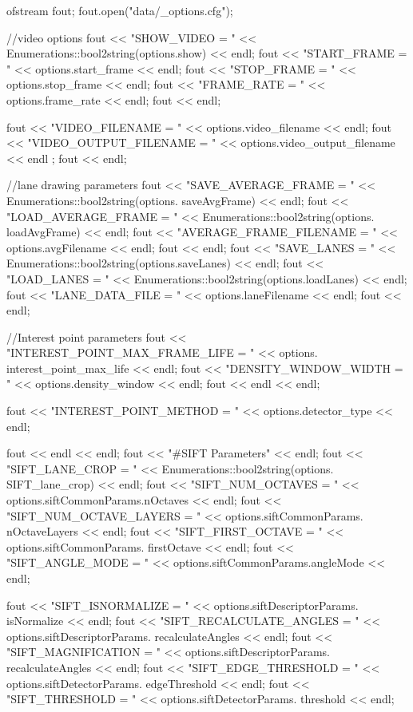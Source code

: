 \begin{DoxyCode}
                                                 {

    ofstream fout;
    fout.open("data/_options.cfg");

    //video options
    fout << "SHOW_VIDEO     = " << Enumerations::bool2string(options.show) << 
      endl;
    fout << "START_FRAME    = " << options.start_frame << endl;
    fout << "STOP_FRAME     = " << options.stop_frame << endl;
    fout << "FRAME_RATE     = " << options.frame_rate << endl;
    fout << endl;


    fout << "VIDEO_FILENAME = " << options.video_filename << endl;
    fout << "VIDEO_OUTPUT_FILENAME = " << options.video_output_filename << endl
      ;
    fout << endl;

    //lane drawing parameters
    fout << "SAVE_AVERAGE_FRAME     = " << Enumerations::bool2string(options.
      saveAvgFrame) << endl;
    fout << "LOAD_AVERAGE_FRAME     = " << Enumerations::bool2string(options.
      loadAvgFrame) << endl;
    fout << "AVERAGE_FRAME_FILENAME = " << options.avgFilename << endl;
    fout << endl;
    fout << "SAVE_LANES     = " << Enumerations::bool2string(options.saveLanes)
       << endl;
    fout << "LOAD_LANES     = " << Enumerations::bool2string(options.loadLanes)
       << endl;
    fout << "LANE_DATA_FILE = " << options.laneFilename << endl;
    fout << endl;

    //Interest point parameters
    fout << "INTEREST_POINT_MAX_FRAME_LIFE = " << options.
      interest_point_max_life << endl;
    fout << "DENSITY_WINDOW_WIDTH          = " << options.density_window << 
      endl;
    fout << endl << endl;

    fout << "INTEREST_POINT_METHOD = " << options.detector_type << endl;

    fout << endl << endl;
    fout << "#SIFT Parameters" << endl;
    fout << "SIFT_LANE_CROP           = " << Enumerations::bool2string(options.
      SIFT_lane_crop) << endl;
    fout << "SIFT_NUM_OCTAVES         = " << options.siftCommonParams.nOctaves 
      << endl;
    fout << "SIFT_NUM_OCTAVE_LAYERS   = " << options.siftCommonParams.
      nOctaveLayers << endl;
    fout << "SIFT_FIRST_OCTAVE        = " << options.siftCommonParams.
      firstOctave << endl;
    fout << "SIFT_ANGLE_MODE          = " << options.siftCommonParams.angleMode
       << endl;

    fout << "SIFT_ISNORMALIZE         = " << options.siftDescriptorParams.
      isNormalize << endl;
    fout << "SIFT_RECALCULATE_ANGLES  = " << options.siftDescriptorParams.
      recalculateAngles << endl;
    fout << "SIFT_MAGNIFICATION       = " << options.siftDescriptorParams.
      recalculateAngles << endl;
    fout << "SIFT_EDGE_THRESHOLD      = " << options.siftDetectorParams.
      edgeThreshold << endl;
    fout << "SIFT_THRESHOLD           = " << options.siftDetectorParams.
      threshold << endl;

}
\end{DoxyCode}
